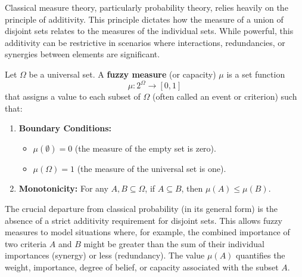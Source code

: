 Classical measure theory, particularly probability theory, relies heavily on the principle of additivity. This principle dictates how the measure of a union of disjoint sets relates to the measures of the individual sets. While powerful, this additivity can be restrictive in scenarios where interactions, redundancies, or synergies between elements are significant.

\begin{definition}
Let $\Omega$ be a universal set. A \textbf{fuzzy measure} (or capacity) $\mu$ is a set function
\[ \mu: 2^\Omega \to [0, 1] \]
that assigns a value to each subset of $\Omega$ (often called an event or criterion) such that:
\begin{enumerate}
    \item \textbf{Boundary Conditions:}
    \begin{itemize}
        \item $\mu(\emptyset) = 0$ (the measure of the empty set is zero).
        \item $\mu(\Omega) = 1$ (the measure of the universal set is one).
    \end{itemize}
    \item \textbf{Monotonicity:} For any $A, B \subseteq \Omega$, if $A \subseteq B$, then $\mu(A) \le \mu(B)$.
\end{enumerate}
\end{definition}

The crucial departure from classical probability (in its general form) is the absence of a strict additivity requirement for disjoint sets. This allows fuzzy measures to model situations where, for example, the combined importance of two criteria $A$ and $B$ might be greater than the sum of their individual importances (synergy) or less (redundancy). The value $\mu(A)$ quantifies the weight, importance, degree of belief, or capacity associated with the subset $A$.

